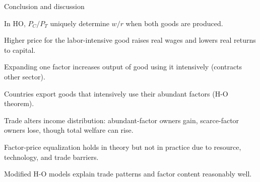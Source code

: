 \documentclass[notes,11pt, aspectratio=169, xcolor=table]{beamer}
\newenvironment{wideitemize}{\itemize\addtolength{\itemsep}{10pt}}{\enditemize}
\begin{document}
\begin{frame}{Conclusion and discussion}
\begin{wideitemize}
    \item In HO, $P_C/P_T$ uniquely determine $w/r$ when both goods are produced.
    \item Higher price for the labor-intensive good raises real wages and lowers real returns to capital.
    \item Expanding one factor increases output of good using it intensively (contracts other sector).
    \item Countries export goods that intensively use their abundant factors (H-O theorem).
    \item Trade alters income distribution: abundant-factor owners gain, scarce-factor owners lose, though total welfare can rise.
    
    \item Factor-price equalization holds in theory but not in practice due to resource, technology, and trade barriers.
    \item Modified H-O models explain trade patterns and factor content reasonably well.


\end{wideitemize}
\end{frame}
\end{document}
